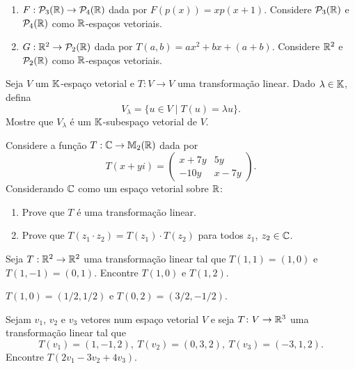 \documentclass[12pt]{exam}
\begin{document}
\begin{exercicio}
\begin{enumerate}[label={\alph*})]
    \item $F : \mathcal{P}_3(\mathbb{R}) \to \mathcal{P}_4(\mathbb{R})$ dada por $F(p(x)) = xp(x + 1)$. Considere $\mathcal{P}_3(\mathbb{R})$ e $\mathcal{P}_4(\mathbb{R})$ como $\mathbb{R}$-espaços vetoriais.

    \item $G : \mathbb{R}^2 \to \mathcal{P}_2(\mathbb{R})$ dada por $T(a,b) = ax^2 + bx + (a + b)$. Considere $\mathbb{R}^2$ e $\mathcal{P}_2(\mathbb{R})$ como $\mathbb{R}$-espaços vetoriais.
  \end{enumerate}
\end{exercicio}

\begin{exercicio}
  Seja $V$ um $\mathbb{K}$-espaço vetorial e $T : V \to V$ uma transformação linear. Dado $\lambda \in \mathbb{K}$, defina
  \[
      V_\lambda = \{ u \in V \mid T(u) = \lambda u\}.
  \]
  Mostre que $V_\lambda$ é um $\mathbb{K}$-subespaço vetorial de $V$.
\end{exercicio}

\begin{exercicio}
  Considere a função $T : \mathbb{C} \to \mathbb{M}_2(\mathbb{R})$ dada por
  \[
      T(x + yi) = \begin{pmatrix}
                        x + 7y & 5y\\
                       -10y & x - 7y
                   \end{pmatrix}.
  \]
  Considerando $\mathbb{C}$ como um espaço vetorial sobre $\mathbb{R}$:
  \begin{enumerate}[label={\alph*})]
    \item Prove que $T$ é uma transformação linear.

    \item Prove que $T(z_1\cdot z_2) = T(z_1)\cdot T(z_2)$ para todos $z_1$, $z_2 \in \mathbb{C}$.
  \end{enumerate}
\end{exercicio}

\begin{exercicio}
  Seja $T : \mathbb{R}^2 \to \mathbb{R}^2$ uma transformação linear tal que $T(1,1) = (1,0)$ e $T(1,-1) = (0,1)$. Encontre $T(1,0)$ e $T(1,2)$.
  \begin{solucao}
    $T(1,0) = (1/2,1/2)$ e $T(0,2) = (3/2,-1/2)$.
  \end{solucao}
\end{exercicio}

\begin{exercicio}
  Sejam $v_1$, $v_2$ e $v_3$ vetores num espaço vetorial $V$ e seja $T \colon V \to \mathbb{R}^3$ uma transformação linear tal que
  \[
    T(v_1) = (1, -1, 2), \ T(v_2) = (0, 3, 2), \ T(v_3) = (-3, 1, 2).
  \]
  Encontre $T(2v_1 - 3v_2 + 4v_3)$.
\end{exercicio}
\end{document}
